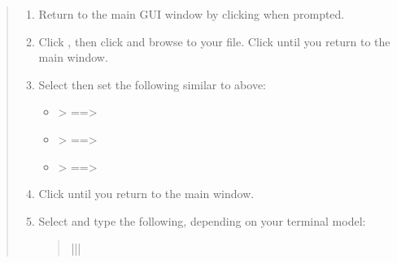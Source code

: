 \documentclass[letterpaper,10pt,english]{sphinxmanual}
\begin{document}
\begin{enumerate}
\begin{quote}
\begin{enumerate}
\item {} 
Return to the main GUI window by clicking  when prompted.

\item {} 
Click , then click  and browse to your  file.  Click  until you return to the main window.

\item {} 
Select  then set the following similar to  above:
\begin{itemize}
\item {} 
 \textendash{}\textgreater{}  ==\textgreater{} 

\item {} 
 \textendash{}\textgreater{}  ==\textgreater{} 

\item {} 
 \textendash{}\textgreater{}  ==\textgreater{} 

\end{itemize}

\item {} 
Click  until you return to the main window.

\item {} 
Select  and type the following, depending on your terminal model:
\begin{quote}


\begin{savenotes}\sphinxattablestart
\centering
{}
\label{\detokenize{usage:id2}}
\sphinxaftercaption
\begin{tabular}[t]{|*{2}{|}}
\hline


\end{tabular}
\end{savenotes}
\end{quote}
\end{enumerate}
\end{quote}
\end{enumerate}
\end{document}
